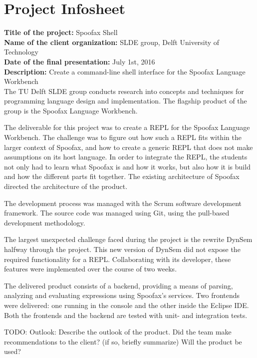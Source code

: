 \chapter{Project Infosheet}
\label{cha:infosheet}
\newpage

\noindent
\textbf{Title of the project:} Spoofax Shell\\
\textbf{Name of the client organization:} SLDE group, Delft University of Technology\\
\textbf{Date of the final presentation:} July 1st, 2016\\
\textbf{Description:} Create a command-line shell interface for the Spoofax
Language Workbench\\

The TU Delft SLDE group conducts research into concepts and techniques for
programming language design and implementation. The flagship product of the
group is the Spoofax Language Workbench.

The deliverable for this project was to create a REPL for the Spoofax Language
Workbench. The challenge was to figure out how such a REPL fits within the larger
context of Spoofax, and how to create a generic REPL that does not make assumptions
on its host language. In order to integrate the REPL, the students not only had
to learn what Spoofax is and how it works, but also how it is build and how the
different parts fit together. The existing architecture of Spoofax directed the
architecture of the product.

The development process was managed with the Scrum software development
framework. The source code was managed using Git, using the pull-based
development methodology.

The largest unexpected challenge faced during the project is the rewrite DynSem
halfway through the project. This new version of DynSem did not expose the
required functionality for a REPL. Collaborating with its developer, these
features were implemented over the course of two weeks.

The delivered product consists of a backend, providing a means of parsing,
analyzing and evaluating expressions using Spoofax's services. Two frontends
were delivered: one running in the console and the other inside the Eclipse IDE.
Both the frontends and the backend are tested with unit- and integration tests.

TODO: Outlook: Describe the outlook of the product. Did the team make recommendations to the 
client? (if so, briefly summarize) Will the product be used?\\

